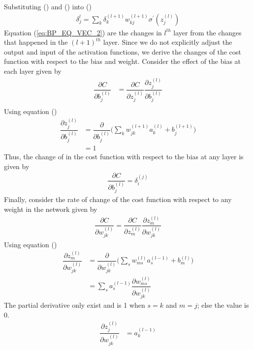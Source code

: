 Substituting () and () into ()
\begin{align}
  \label{eq:BP_EQ_VEC_2}
  \delta_j^l = \sum_k \delta_k^{(l+1)} w_{kj}^{(l+1)} \sigma^{'}(z_j^{(l)})
\end{align}
Equation (\ref{eq:BP_EQ_VEC_2}) are the changes in $l^{th}$ layer from the changes that happened in the $(l+1)^{th}$ layer. Since we do not explicitly adjust the output and input of the activation functions, we derive the changes of the cost function with respect to the bias and weight. Consider the effect of the bias at each layer given by 
\begin{align*}
  \dfrac{\partial C}{\partial b_j^{(l)}} &= \dfrac{\partial C}{\partial z_j^{(l)}} \dfrac{\partial z_j^{(l)}}{\partial b_j^{(l)}} \\
\end{align*}
Using equation ()
\begin{align*}
  \dfrac{\partial z_j^{(l)}}{\partial b_j^{(l)}} &= \dfrac{\partial}{\partial b_j^{(l)}} \Big(  \sum_kw_{jk}^{(l+1)}a_k^{(l)} + b_j^{(l+1)}  \Big) \\
  &= 1
\end{align*}
Thus, the change of in the cost function with respect to the bias at any layer is given by 
\begin{align}
  \label{eq:BP_EQ_VEC_3}
  \dfrac{\partial C}{\partial b_j^{(l)}} = \delta_i^{(j)}
\end{align}
Finally, consider the rate of change of the cost function with respect to any weight in the network given by 
\begin{align}
  \label{eq: partial_C_with_weight}
  \dfrac{\partial C}{\partial w_{jk}^{(l)}} = \dfrac{\partial C}{\partial z_m^{(l)}} \dfrac{\partial z_m^{(l)}}{\partial w_{jk}^{(l)}}
\end{align}
Using equation ()
\begin{align}
  \nonumber
  \dfrac{\partial z_m^{(l)}}{\partial w_{jk}^{(l)}} &= \dfrac{\partial}{\partial w_{jk}^{(l)}} \Big(  \sum_sw_{ms}^{(l)}a_s^{(l-1)} + b_m^{(l)}  \Big) \\
  \nonumber
  &= \sum_s a_s^{(l-1)} \dfrac{\partial w_{ms}^{(l)}}{\partial w_{jk}^{(l)}}
\end{align}
The partial derivative only exist and is 1 when $s=k$ and $m=j$; else the value is 0.
\begin{align}
  \label{eq: partial_act_weight}
  \dfrac{\partial z_j^{(l)}}{\partial w_{jk}^{(l)}} &= a_k^{(l-1)}
\end{align}
